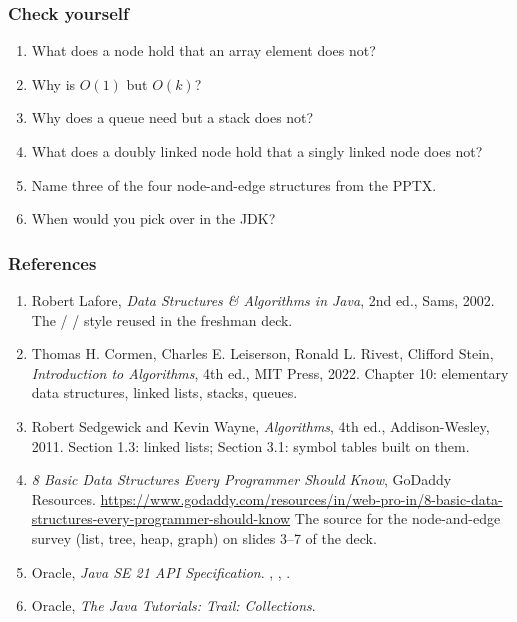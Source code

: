 \documentclass[aspectratio=169,10pt,compress]{beamer}
\begin{document}
\begin{frame}[t,fragile] \frametitle{Check yourself}
  \begin{enumerate}\small
    \item What does a node hold that an array element does not?
    \item Why is  $O(1)$ but  $O(k)$?
    \item Why does a queue need  but a stack does not?
    \item What does a doubly linked node hold that a singly linked
          node does not?
    \item Name three of the four node-and-edge structures from the PPTX.
    \item When would you pick  over 
          in the JDK?
  \end{enumerate}
\end{frame}




\begin{frame}[t,fragile] \frametitle{References}
  \begin{enumerate}\small
    \item Robert Lafore, \emph{Data Structures \& Algorithms in Java},
          2nd ed., Sams, 2002.
          \newline
          The  /  / 
          style reused in the freshman deck.
    \item Thomas H. Cormen, Charles E. Leiserson, Ronald L. Rivest,
          Clifford Stein, \emph{Introduction to Algorithms}, 4th ed.,
          MIT Press, 2022.
          \newline
          Chapter 10: elementary data structures, linked lists,
          stacks, queues.
    \item Robert Sedgewick and Kevin Wayne, \emph{Algorithms},
          4th ed., Addison-Wesley, 2011.
          \newline
          Section 1.3: linked lists; Section 3.1: symbol tables
          built on them.
    \item \emph{8 Basic Data Structures Every Programmer Should Know},
          GoDaddy Resources.
          \newline
          \url{https://www.godaddy.com/resources/in/web-pro-in/8-basic-data-structures-every-programmer-should-know}
          \newline
          The source for the node-and-edge survey (list, tree,
          heap, graph) on slides 3--7 of the deck.
    \item Oracle, \emph{Java SE 21 API Specification}.
          \newline
          , ,
          .
    \item Oracle, \emph{The Java Tutorials: Trail: Collections}.
  \end{enumerate}
\end{frame}
\end{document}

